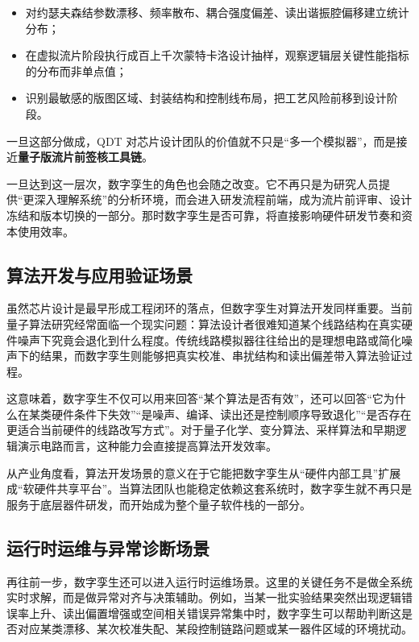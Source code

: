 \documentclass[11pt,a4paper]{article}
\newcommand{\QDT}{QDT}
\begin{document}
\begin{itemize}
  \item 对约瑟夫森结参数漂移、频率散布、耦合强度偏差、读出谐振腔偏移建立统计分布；
  \item 在虚拟流片阶段执行成百上千次蒙特卡洛设计抽样，观察逻辑层关键性能指标的分布而非单点值；
  \item 识别最敏感的版图区域、封装结构和控制线布局，把工艺风险前移到设计阶段。
\end{itemize}

一旦这部分做成，\QDT{} 对芯片设计团队的价值就不只是“多一个模拟器”，而是接近\textbf{量子版流片前签核工具链}。

一旦达到这一层次，数字孪生的角色也会随之改变。它不再只是为研究人员提供“更深入理解系统”的分析环境，而会进入研发流程前端，成为流片前评审、设计冻结和版本切换的一部分。那时数字孪生是否可靠，将直接影响硬件研发节奏和资本使用效率。

\subsection{算法开发与应用验证场景}

虽然芯片设计是最早形成工程闭环的落点，但数字孪生对算法开发同样重要。当前量子算法研究经常面临一个现实问题：算法设计者很难知道某个线路结构在真实硬件噪声下究竟会退化到什么程度。传统线路模拟器往往给出的是理想电路或简化噪声下的结果，而数字孪生则能够把真实校准、串扰结构和读出偏差带入算法验证过程。

这意味着，数字孪生不仅可以用来回答“某个算法是否有效”，还可以回答“它为什么在某类硬件条件下失效”“是噪声、编译、读出还是控制顺序导致退化”“是否存在更适合当前硬件的线路改写方式”。对于量子化学、变分算法、采样算法和早期逻辑演示电路而言，这种能力会直接提高算法开发效率。

从产业角度看，算法开发场景的意义在于它能把数字孪生从“硬件内部工具”扩展成“软硬件共享平台”。当算法团队也能稳定依赖这套系统时，数字孪生就不再只是服务于底层器件研发，而开始成为整个量子软件栈的一部分。

\subsection{运行时运维与异常诊断场景}

再往前一步，数字孪生还可以进入运行时运维场景。这里的关键任务不是做全系统实时求解，而是做异常对齐与决策辅助。例如，当某一批实验结果突然出现逻辑错误率上升、读出偏置增强或空间相关错误异常集中时，数字孪生可以帮助判断这是否对应某类漂移、某次校准失配、某段控制链路问题或某一器件区域的环境扰动。
\end{document}
